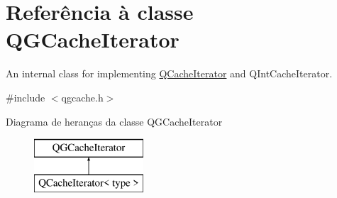 \hypertarget{class_q_g_cache_iterator}{\section{Referência à classe Q\-G\-Cache\-Iterator}
\label{class_q_g_cache_iterator}
}


An internal class for implementing \hyperlink{class_q_cache_iterator}{Q\-Cache\-Iterator} and Q\-Int\-Cache\-Iterator.  




{\ttfamily \#include $<$qgcache.\-h$>$}

Diagrama de heranças da classe Q\-G\-Cache\-Iterator\begin{figure}[H]
\begin{center}
\leavevmode
\includegraphics[height=2.000000cm]{class_q_g_cache_iterator}
\end{center}
\end{figure}
